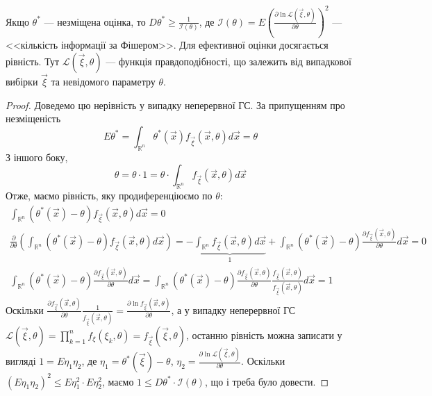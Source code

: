 \begin{theorem*}
    Якщо $\theta^*$ --- незміщена оцінка, то $D\theta^* \geq \frac{1}{\mathcal{I}(\theta)}$, 
    де $\mathcal{I}(\theta) = E\left( \frac{\partial \ln \mathcal{L}(\vec{\xi}, \theta)}{\partial \theta}\right)^2$ --- 
    {<<кількість інформації за Фішером>>}. Для ефективної оцінки досягається рівність. Тут
    $\mathcal{L}(\vec{\xi}, \theta)$ --- функція правдоподібності, що залежить від випадкової вибірки $\vec{\xi}$ та 
    невідомого параметру $\theta$. 
\end{theorem*}
\begin{proof}
    Доведемо цю нерівність у випадку неперервної ГС. 
    За припущенням про незміщеність $$E\theta^* = \int_{\mathbb{R}^n}\theta^*(\vec{x}) f_{\vec{\xi}}(\vec{x}, \theta) d\vec{x} = \theta$$
    З іншого боку, $$ \theta = \theta \cdot 1 = \theta \cdot \int_{\mathbb{R}^n}f_{\vec{\xi}}(\vec{x}, \theta) d\vec{x}$$
    Отже, маємо рівність, яку продиференціюємо по $\theta$: 
    \begin{gather*}
        \int_{\mathbb{R}^n}(\theta^*(\vec{x}) - \theta) f_{\vec{\xi}}(\vec{x}, \theta) d\vec{x} = 0 \\
        \frac{\partial}{\partial  \theta}\left(\int_{\mathbb{R}^n}(\theta^*(\vec{x}) - \theta) f_{\vec{\xi}}(\vec{x}, \theta) d\vec{x}\right) =
         -\underbrace{\int_{\mathbb{R}^n}f_{\vec{\xi}}(\vec{x}, \theta) d\vec{x} }_1
         + \int_{\mathbb{R}^n}(\theta^*(\vec{x}) -\theta) \frac{\partial f_{\vec{\xi}}(\vec{x}, \theta)}{\partial \theta} d\vec{x} = 0 \\
         \int_{\mathbb{R}^n}(\theta^*(\vec{x}) -\theta) \frac{\partial f_{\vec{\xi}}(\vec{x}, \theta)}{\partial \theta} d\vec{x} = 
         \int_{\mathbb{R}^n}(\theta^*(\vec{x}) -\theta) \frac{\partial f_{\vec{\xi}}(\vec{x}, \theta)}{\partial \theta} \frac{f_{\vec{\xi}}(\vec{x}, \theta)}{f_{\vec{\xi}}(\vec{x}, \theta)} d\vec{x} = 1
    \end{gather*}
    Оскільки $\frac{\partial f_{\vec{\xi}}(\vec{x}, \theta)}{\partial \theta} \frac{1}{f_{\vec{\xi}}(\vec{x}, \theta)} = \frac{\partial\ln f_{\vec{\xi}}(\vec{x}, \theta)}{\partial \theta}$,
    а у випадку неперервної ГС $\mathcal{L}(\vec{\xi}, \theta) = \prod\limits_{k=1}^n f_{\xi}(\xi_k, \theta) = f_{\vec{\xi}}(\vec{\xi}, \theta)$, останню рівність можна записати у вигляді 
    $1 = E\eta_1 \eta_2$, де $\eta_1 = \theta^*(\vec{\xi}) -\theta$, $\eta_2 = \frac{\partial\ln \mathcal{L}(\vec{\xi}, \theta)}{\partial \theta}$.
    Оскільки $\left( E\eta_1 \eta_2 \right)^2 \leq E\eta_1^2 \cdot E\eta_2^2$, маємо $1 \leq D\theta^* \cdot \mathcal{I}(\theta)$, що і треба було довести.
\end{proof}
